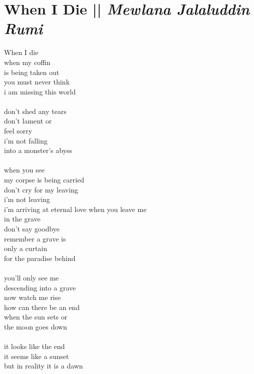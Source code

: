 \section[When I Die]{When I Die || \emph{Mewlana Jalaluddin Rumi} \hspace*{\fill}  \thepage}
\hspace{0pt}
\vfill
\begin{flushleft}
\begin{paracol}{3} 
When I die\\
when my coffin\\
is being taken out\\
you must never think\\
i am missing this world\\ \-\ \\
don't shed any tears\\
don't lament or\\
feel sorry\\
i'm not falling\\
into a monster's abyss\\ \-\ \\
when you see\\
my corpse is being carried\\
don't cry for my leaving\\
i'm not leaving\\
i'm arriving at eternal love
\switchcolumn[1]
when you leave me\\
in the grave\\
don't say goodbye\\
remember a grave is\\
only a curtain\\
for the paradise behind\\ \-\ \\
you'll only see me\\
descending into a grave\\
now watch me rise\\
how can there be an end\\
when the sun sets or\\
the moon goes down\\ \-\ \\
it looks like the end\\
it seems like a sunset\\
but in reality it is a dawn\\

\end{paracol}
\end{flushleft}
